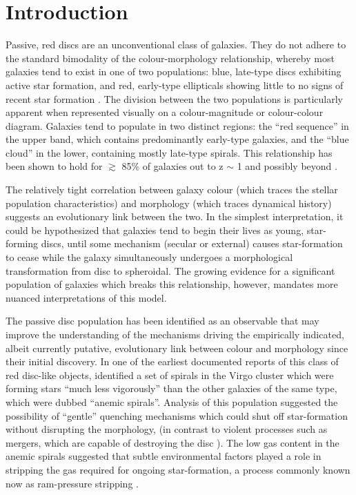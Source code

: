 \documentclass[useAMS,usenatbib]{mn2e}
\begin{document}
\section{Introduction}
\label{sec:Intro}

Passive, red discs are an unconventional class of galaxies. They do not adhere to the standard bimodality of the colour-morphology relationship, whereby most galaxies tend to exist in one of two populations: blue, late-type discs exhibiting active star formation, and red, early-type ellipticals showing little to no signs of recent star formation \citep{Strateva2001, Baldry2004, Correa2017}. The division between the two populations is particularly apparent when represented visually on a colour-magnitude or colour-colour diagram. Galaxies tend to populate in two distinct regions: the ``red sequence'' in the upper band, which contains predominantly early-type galaxies, and the ``blue cloud'' in the lower, containing mostly late-type spirals. This relationship has been shown to hold for $\gtrsim$ 85\% of galaxies out to z $\sim$ 1 \citep{Bell2004,Cirasuolo2007,Mignoli2009} and possibly beyond \citep{Giallongo2005, vanDokkum2006, Franzetti2007, Cassata2008}. 

The relatively tight correlation between galaxy colour (which traces the stellar population characteristics) and morphology (which traces dynamical history) suggests an evolutionary link between the two. In the simplest interpretation, it could be hypothesized that galaxies tend to begin their lives as young, star-forming discs, until some mechanism (secular or external) causes star-formation to cease while the galaxy simultaneously undergoes a morphological transformation from disc to spheroidal. The growing evidence for a significant population of galaxies which breaks this relationship, however, mandates more nuanced interpretations of this model. 

The passive disc population has been identified as an observable that may improve the understanding of the mechanisms driving the empirically indicated, albeit currently putative, evolutionary link between colour and morphology since their initial discovery.  In one of the earliest documented reports of this class of red disc-like objects, \citet{VandenBergh1976} identified a set of spirals in the Virgo cluster which were forming stars ``much less vigorously'' than the other galaxies of the same type, which were dubbed ``anemic spirals''. Analysis of this population suggested the possibility of ``gentle'' quenching mechanisms which could shut off star-formation without disrupting the morphology, (in contrast to violent processes such as mergers, which are capable of destroying the disc \citep{Bell2004,Negroponte1983,DeLucia2006,Springel2005}). The low gas content in the anemic spirals suggested that subtle environmental factors played a role in stripping the gas required for ongoing star-formation, a process commonly known now as ram-pressure stripping \citep{Gunn1972,Steinhauser2016}. 
\end{document}
